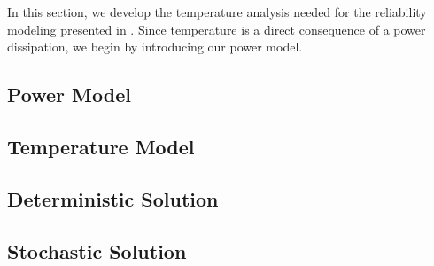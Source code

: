 In this section, we develop the temperature analysis needed for the reliability modeling presented in .
Since temperature is a direct consequence of a power dissipation, we begin by introducing our power model.

\subsection{Power Model} 


\subsection{Temperature Model} 


\subsection{Deterministic Solution} 


\subsection{Stochastic Solution} 

